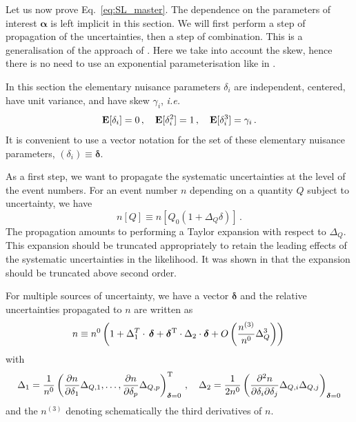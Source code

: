 \documentclass[11pt]{article}
\def\ie{{\it i.e.}}
\newcommand{\be}{\begin{equation}}
\newcommand{\ee}{\end{equation}}
\begin{document}
Let us now prove Eq.~\eqref{eq:SL_master}.  The dependence on the parameters of interest $\bm{\alpha}$ is left implicit in this section. We will first perform a step of  propagation of the uncertainties, then a step of combination. This is a generalisation of the approach of \cite{Fichet:2016gvx}. Here we take into account the skew, hence there is no need to use an exponential parameterisation like in \cite{Fichet:2016gvx}.

In this section the elementary nuisance parameters $\delta_i$ are independent, centered, have unit variance, and have skew $\gamma_i$, \ie
\be
{\bf E}[\delta_i]=0\,,\quad {\bf E}[\delta_i^2]=1 \,,\quad {\bf E}[\delta_i^3]=\gamma_i\,.
\ee
It is  convenient to use a vector notation for the set of these elementary nuisance parameters, $(\delta_i)\equiv \boldsymbol{\delta} $.

As a first step, we want to propagate the systematic uncertainties at the level of the event numbers.  For an event number $n$ depending on a quantity $Q$ subject to uncertainty, we have
\be n[Q]\equiv n[Q_0(1+\Delta_Q \delta)]\,.
\ee
The propagation amounts to performing a Taylor expansion with respect to $\Delta_Q $. This expansion should be truncated appropriately  to retain the leading effects of the systematic uncertainties in the likelihood. It was shown in \cite{Fichet:2016gvx} that  the expansion should be truncated above second order.

For multiple sources of uncertainty, we have a vector $\boldsymbol{\delta}$ and the relative uncertainties propagated to $n$ are written as
\be n\equiv n^{0}\left( 1+ \Delta_{1}^T\cdot \, \boldsymbol{\delta}+\boldsymbol{\delta}^{\rm T}\cdot\Delta_{2} \cdot \boldsymbol{\delta} +O\left(\frac{n^{(3)}}{n^{0}}\Delta_Q^3\right)
\right)\,
\label{eq:propmult}
\ee
with
\be
\Delta_1=\frac{1}{n^{0}}\left(\frac{\partial n }{\partial \delta_{1}}\Delta_{Q,1},\ldots,
\frac{ \partial n }{\partial \delta_{p}}\Delta_{Q,p} \right)_{\boldsymbol{\delta}=0}^{\rm T} \,, \label{eq:stdDelta1} \quad \Delta_2=\frac{1}{2n^{0}}\left(\frac{\partial^2 n}{\partial \delta_{i}\partial \delta_{j}}\Delta_{Q,i}\Delta_{Q,j}  \right)_{\boldsymbol{\delta}=0} 
\ee
and the $n^{(3)}$ denoting schematically the third derivatives of $n$.
\end{document}

